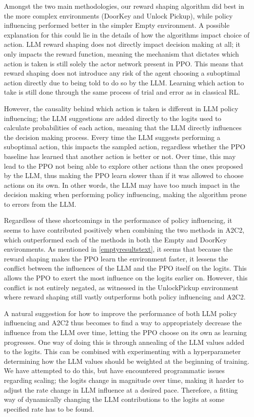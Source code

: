 \documentclass[conference]{IEEEtran}
\begin{document}
Amongst the two main methodologies, our reward shaping algorithm did best in the more complex environments (DoorKey and Unlock Pickup), while policy influencing performed better in the simpler Empty environment. A possible explanation for this could lie in the details of how the algorithms impact choice of action. LLM reward shaping does not directly impact decision making at all; it only impacts the reward function, meaning the mechanism that dictates which action is taken is still solely the actor network present in PPO. This means that reward shaping does not introduce any risk of the agent choosing a suboptimal action directly due to being told to do so by the LLM. Learning which action to take is still done through the same process of trial and error as in classical RL.

However, the causality behind which action is taken is different in LLM policy influencing; the LLM suggestions are added directly to the logits used to calculate probabilities of each action, meaning that the LLM directly influences the decision making process. Every time the LLM suggests performing a suboptimal action, this impacts the sampled action, regardless whether the PPO baseline has learned that another action is better or not. Over time, this may lead to the PPO not being able to explore other actions than the ones proposed by the LLM, thus making the PPO learn slower than if it was allowed to choose actions on its own. In other words, the LLM may have too much impact in the decision making when performing policy influencing, making the algorithm prone to errors from the LLM.

Regardless of these shortcomings in the performance of policy influencing, it seems to have contributed positively when combining the two methods in A2C2, which outperformed each of the methods in both the Empty and DoorKey environments. As mentioned in \ref{emptyresultstext}, it seems that because the reward shaping makes the PPO learn the environment faster, it lessens the conflict between the influences of the LLM and the PPO itself on the logits. This allows the PPO to exert the most influence on the logits earlier on. However, this conflict is not entirely negated, as witnessed in the UnlockPickup environment where reward shaping still vastly outperforms both policy influencing and A2C2.

A natural suggestion for how to improve the performance of both LLM policy influencing and A2C2 thus becomes to find a way to appropriately decrease the influence from the LLM over time, letting the PPO choose on its own as learning progresses. One way of doing this is through annealing of the LLM values added to the logits. This can be combined with experimenting with a hyperparameter determining how the LLM values should be weighted at the beginning of training. We have attempted to do this, but have encountered programmatic issues regarding scaling; the logits change in magnitude over time, making it harder to adjust the rate change in LLM influence at a desired pace. Therefore, a fitting way of dynamically changing the LLM contributions to the logits at some specified rate has to be found.
\end{document}
